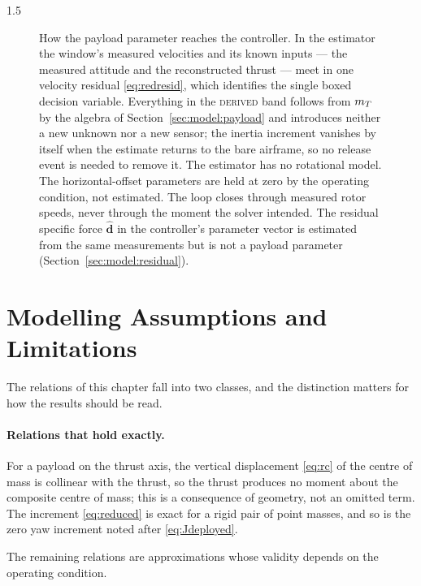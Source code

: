 \begin{spacing}{1.5}
\begin{figure}[tbp]
\caption[How the payload parameter reaches the controller]{How the payload parameter reaches the controller. In the
estimator the window's measured velocities and its known inputs --- the
measured attitude and the reconstructed thrust --- meet in one velocity residual
\eqref{eq:redresid}, which identifies the single boxed decision variable. Everything in the \textsc{derived} band follows
from $m_T$ by the algebra of Section~\ref{sec:model:payload} and introduces
neither a new unknown nor a new sensor; the inertia increment vanishes by itself
when the estimate returns to the bare airframe, so no release event is needed to
remove it. The estimator has no rotational model. The horizontal-offset parameters are held at zero by the operating
condition, not estimated. The loop closes through measured rotor speeds, never
through the moment the solver intended. The residual specific force $\hat{\bm d}$ in the controller's parameter vector is estimated from the same measurements but is not a payload parameter (Section~\ref{sec:model:residual}).}
\label{fig:paramflow}
\end{figure}

\section{Modelling Assumptions and Limitations}\label{sec:model:approx}

The relations of this chapter fall into two classes, and the distinction matters
for how the results should be read.

\paragraph{Relations that hold exactly.} For a payload on the thrust axis, the
vertical displacement \eqref{eq:rc} of the centre of mass is collinear with the
thrust, so the thrust produces no moment about the composite centre of mass;
this is a consequence of geometry, not an omitted term. The increment
\eqref{eq:reduced} is exact for a rigid pair of point masses, and so is the zero
yaw increment noted after \eqref{eq:Jdeployed}.

The remaining relations are approximations whose validity depends on the
operating condition.


\end{spacing}
